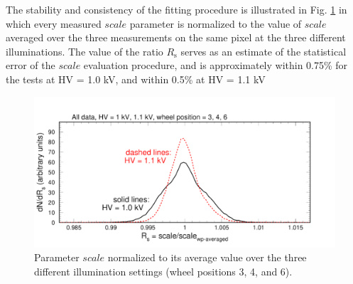 The stability and consistency of the fitting procedure is illustrated in Fig. \ref{fig:pglobal_Rs} in which every measured $scale$ parameter is normalized to the value of $scale$ averaged over the three measurements on the same pixel at the three different illuminations. The value of the ratio $R_{\mathrm{s}}$ serves as an estimate of the statistical error of the $scale$ evaluation procedure, and is approximately within 0.75\% for the tests at HV = 1.0 kV, and within 0.5\% at HV = 1.1 kV 
\begin{figure}[hbt]
	\centering
	\includegraphics[width=0.98\linewidth, trim=0 15 50 35, clip]{figures/pglobal_Rs.pdf}
	\caption{Parameter $scale$ normalized to its average value over the three different illumination settings (wheel positions 3, 4, and 6).}
	\label{fig:pglobal_Rs}
\end{figure}

